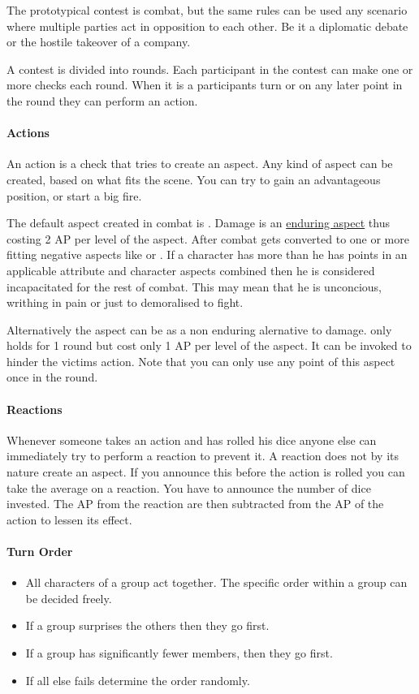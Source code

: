 \documentclass[11pt]{article}
\begin{document}
{The prototypical contest is combat, but the same rules can be used any scenario where multiple parties act in opposition to each other. Be it a diplomatic debate or the hostile takeover of a company. 

A contest is divided into rounds. Each participant in the contest can make one or more checks each round. When it is a participants turn or on any later point in the round they can perform an action.
\paragraph*{Actions}
\label{sec:org7c76846}
An action is a check that tries to create an aspect. Any kind of aspect can be created, based on what fits the scene. You can try to gain an advantageous position, or start a big fire.

The default aspect created in combat is . Damage is an \hyperref[sec:orgafbb491]{enduring aspect} thus costing 2 AP per level of the aspect. After combat  gets converted to one or more fitting negative aspects like  or .
If a character has more  than he has points in an applicable attribute and character aspects combined then he is considered incapacitated for the rest of combat. This may mean that he is unconcious, writhing in pain or just to demoralised to fight.

Alternatively the aspect can be  as a non enduring alernative to damage.  only holds for 1 round but cost only 1 AP per level of the aspect. It can be invoked to hinder the victims action. Note that you can only use any point of this aspect once in the round. 
\paragraph*{Reactions}
\label{sec:org4eca5ee}
Whenever someone takes an action and has rolled his dice anyone else can immediately try to perform a reaction to prevent it. A reaction does not by its nature create an aspect. If you announce this before the action is rolled you can take the average on a reaction. You have to announce the number of dice invested. The AP from the reaction are then subtracted from the AP of the action to lessen its effect.
\paragraph*{Turn Order}
\label{sec:org2f358dd}
\begin{itemize}
\item All characters of a group act together. The specific order within a group can be decided freely.
\item If a group surprises the others then they go first.
\item If a group has significantly fewer members, then they go first.
\item If all else fails determine the order randomly.
\end{itemize}

}
\end{document}
